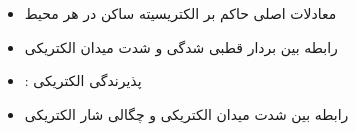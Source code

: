 \begin{ELjoin}

\begin{itemize}
\tightlist
\item
  معادلات اصلی حاکم بر الکتریسیته ساکن در هر محیط
\end{itemize}

\begin{ELimportant}{}


\end{ELimportant}

\end{ELjoin}

\ELhold


\begin{ELjoin}

\begin{itemize}
\tightlist
\item
  رابطه بین بردار قطبی شدگی و شدت میدان الکتریکی
\end{itemize}


\begin{itemize}
\item
  : پذیرندگی الکتریکی
\item
  رابطه بین شدت میدان الکتریکی و چگالی شار الکتریکی
\end{itemize}

\begin{ELimportant}{}


\end{ELimportant}

\end{ELjoin}

